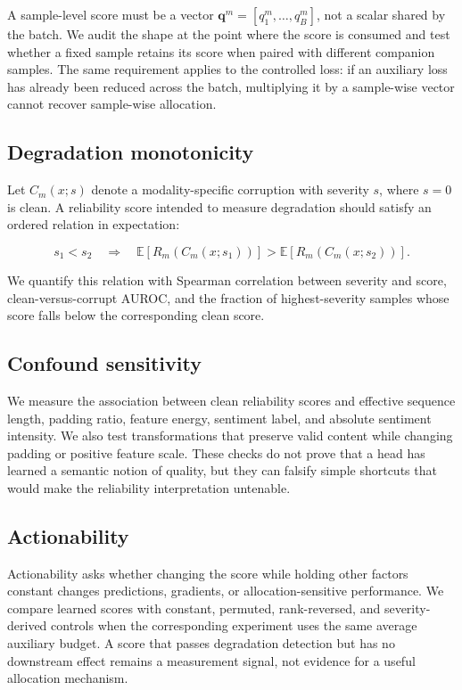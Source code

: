 A sample-level score must be a vector
\(\mathbf q^m=[q_1^m,\ldots,q_B^m]\), not a scalar shared by the batch.
We audit the shape at the point where the score is consumed and test
whether a fixed sample retains its score when paired with different
companion samples. The same requirement applies to the controlled loss:
if an auxiliary loss has already been reduced across the batch,
multiplying it by a sample-wise vector cannot recover sample-wise
allocation.

\subsection{Degradation
monotonicity}\label{degradation-monotonicity}

Let \(C_m(x;s)\) denote a modality-specific corruption with severity
\(s\), where \(s=0\) is clean. A reliability score intended to measure
degradation should satisfy an ordered relation in expectation:

\[
s_1<s_2 \quad\Rightarrow\quad
\mathbb E[R_m(C_m(x;s_1))] > \mathbb E[R_m(C_m(x;s_2))].
\]

We quantify this relation with Spearman correlation between severity and
score, clean-versus-corrupt AUROC, and the fraction of highest-severity
samples whose score falls below the corresponding clean score.

\subsection{Confound sensitivity}\label{confound-sensitivity}

We measure the association between clean reliability scores and
effective sequence length, padding ratio, feature energy, sentiment
label, and absolute sentiment intensity. We also test transformations
that preserve valid content while changing padding or positive feature
scale. These checks do not prove that a head has learned a semantic
notion of quality, but they can falsify simple shortcuts that would make
the reliability interpretation untenable.

\subsection{Actionability}\label{actionability}

Actionability asks whether changing the score while holding other
factors constant changes predictions, gradients, or allocation-sensitive
performance. We compare learned scores with constant, permuted,
rank-reversed, and severity-derived controls when the corresponding
experiment uses the same average auxiliary budget. A score that passes
degradation detection but has no downstream effect remains a measurement
signal, not evidence for a useful allocation mechanism.

